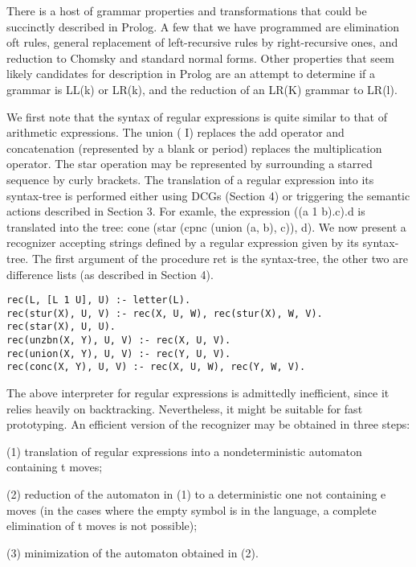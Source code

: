 There is a host of grammar properties and transformations that could be
succinctly described in Prolog. A few that we have programmed are elimination
oft rules, general replacement of left-recursive rules by right-recursive ones, and
reduction to Chomsky and standard normal forms. Other properties that seem
likely candidates for description in Prolog are an attempt to determine if a
grammar is LL(k) or LR(k), and the reduction of an LR(K) grammar to LR(l). 

\label{cohen6}

We first note that the syntax of regular expressions is quite similar to that of
arithmetic expressions. The union ( I) replaces the add operator and concatenation
(represented by a blank or period) replaces the multiplication operator. The
star operation may be represented by surrounding a starred sequence by curly
brackets. The translation of a regular expression into its syntax-tree is performed
either using DCGs (Section 4) or triggering the semantic actions described in
Section 3. For examle, the expression ((a 1 b).c).d is translated into the tree:
cone (star (cpnc (union (a, b), c)), d). We now present a recognizer accepting strings
defined by a regular expression given by its syntax-tree. The first argument of
the procedure ret is the syntax-tree, the other two are difference lists (as described
in Section 4).
\begin{verbatim}
rec(L, [L 1 U], U) :- letter(L).
rec(stur(X), U, V) :- rec(X, U, W), rec(stur(X), W, V).
rec(star(X), U, U).
rec(unzbn(X, Y), U, V) :- rec(X, U, V).
rec(union(X, Y), U, V) :- rec(Y, U, V).
rec(conc(X, Y), U, V) :- rec(X, U, W), rec(Y, W, V).  
\end{verbatim}
The above interpreter for regular expressions is admittedly inefficient, since it
relies heavily on backtracking. Nevertheless, it might be suitable for fast prototyping.
An efficient version of the recognizer may be obtained in three steps:

(1) translation of regular expressions into a nondeterministic automaton containing
t moves;

(2) reduction of the automaton in (1) to a deterministic one not containing e
moves (in the cases where the empty symbol is in the language, a complete
elimination of t moves is not possible);

(3) minimization of the automaton obtained in (2). 

